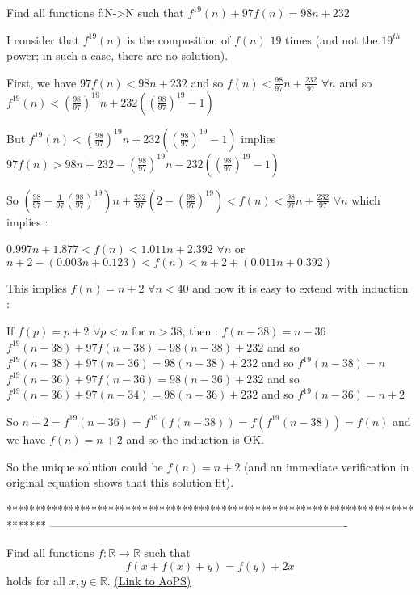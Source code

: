 \begin{mysolution}
	\begin{tcolorbox}Find all functions f:N->N such that $ f^{19}(n)+97f(n)=98n+232$\end{tcolorbox}

I consider that $ f^{19}(n)$ is the composition of $ f(n)$ $ 19$ times (and not the $ 19^{th}$ power; in such a case, there are no solution).

First, we have $ 97f(n)<98n+232$ and so $ f(n)<\frac{98}{97}n+\frac{232}{97}$ $ \forall n$ and so $ f^{19}(n)<(\frac{98}{97})^{19}n+232((\frac{98}{97})^{19}-1)$

But $ f^{19}(n)<(\frac{98}{97})^{19}n+232((\frac{98}{97})^{19}-1)$ implies $ 97f(n)>98n+232-(\frac{98}{97})^{19}n-232((\frac{98}{97})^{19}-1)$

So $ (\frac{98}{97}-\frac{1}{97}(\frac{98}{97})^{19})n+\frac{232}{97}(2-(\frac{98}{97})^{19})<f(n)<\frac{98}{97}n+\frac{232}{97}$ $ \forall n$ which implies :

$ 0.997n+1.877<f(n)<1.011n+2.392$ $ \forall n$ or $ n+2-(0.003n+0.123)<f(n)<n+2+(0.011n+0.392)$

This implies $ f(n)=n+2$ $ \forall n<40$ and now it is easy to extend with induction :

If $ f(p)=p+2$ $ \forall p<n$ for $ n>38$, then :
$ f(n-38)=n-36$
$ f^{19}(n-38)+97f(n-38)=98(n-38)+232$ and so $ f^{19}(n-38)+97(n-36)=98(n-38)+232$ and so $ f^{19}(n-38)=n$
$ f^{19}(n-36)+97f(n-36)=98(n-36)+232$ and so $ f^{19}(n-36)+97(n-34)=98(n-36)+232$ and so $ f^{19}(n-36)=n+2$

So $ n+2=f^{19}(n-36)=f^{19}(f(n-38))=f(f^{19}(n-38))=f(n)$ and we have $ f(n)=n+2$ and so the induction is OK.


So the unique solution could be $ f(n)=n+2$ (and an immediate verification in original equation shows that this solution fit).
\end{mysolution}
*******************************************************************************
-------------------------------------------------------------------------------

\begin{problem}
	Find all functions $f: \mathbb R \to \mathbb R$ such that \[f(x+f(x)+y)=f(y)+2x\] holds for all $x,y \in \mathbb R$.
	\flushright \href{https://artofproblemsolving.com/community/c6h162096}{(Link to AoPS)}
\end{problem}



